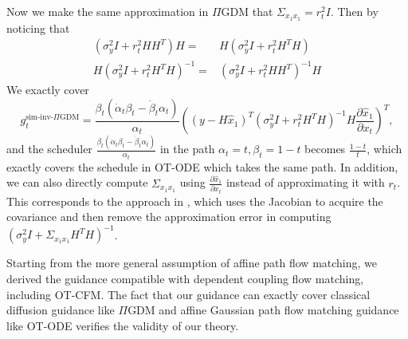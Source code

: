 Now we make the same approximation in $\Pi$GDM that $\Sigma_{x_1x_1} = r_t^2 I$. Then
by noticing that 
\begin{align}
    \nonumber \left(
        {\sigma_y^2}I + r_t^2  H H^T
    \right)H
    =&
    H\left(
        {\sigma_y^2}I + r_t^2  H^T H
    \right)
    \\
    H\left(
        {\sigma_y^2}I + r_t^2  H^T H
    \right)^{-1}
    =&
    \left(
        {\sigma_y^2}I + r_t^2  H H^T
    \right)^{-1}   
    H
\end{align}
We exactly cover 
\begin{equation}
    g_t^{\text{sim-inv-$\Pi$GDM}} = \frac{\beta_t(\dot \alpha_t \beta_t - \dot\beta_t\alpha_t)}{\alpha_t}
    \left(
        \left(
        y - H \hat{x}_1
        \right)^T
        \left(
        {\sigma_y^2}I + r_t^2 H^T H
        \right)^{-1}H
        \frac{\partial \hat{x}_1}{\partial x_t}
    \right)^T,
\end{equation}
and the scheduler $\frac{\beta_t(\dot \alpha_t \beta_t - \dot\beta_t\alpha_t)}{\alpha_t}$ in the path $\alpha_t=t,\beta_t=1-t$ becomes $\frac{1-t}{t}$, which exactly covers the schedule in OT-ODE which takes the same path.
In addition, we can also directly compute $\Sigma_{x_1x_1}$ using $\frac{\partial \hat{x}_1}{\partial x_t}$ instead of approximating it with $r_t$. This corresponds to the approach in \citet{boys_tweedie_2024}, which uses the Jacobian to acquire the covariance and then remove the approximation error in computing $\left(
{\sigma_y^2}I + \Sigma_{x_1 x_1} H^T H
\right)^{-1}$.

\begin{remark}
    Starting from the more general assumption of affine path flow matching, we derived the guidance compatible with dependent coupling flow matching, including OT-CFM. The fact that our guidance can exactly cover classical diffusion guidance like $\Pi$GDM and affine Gaussian path flow matching guidance like OT-ODE verifies the validity of our theory.
\end{remark}